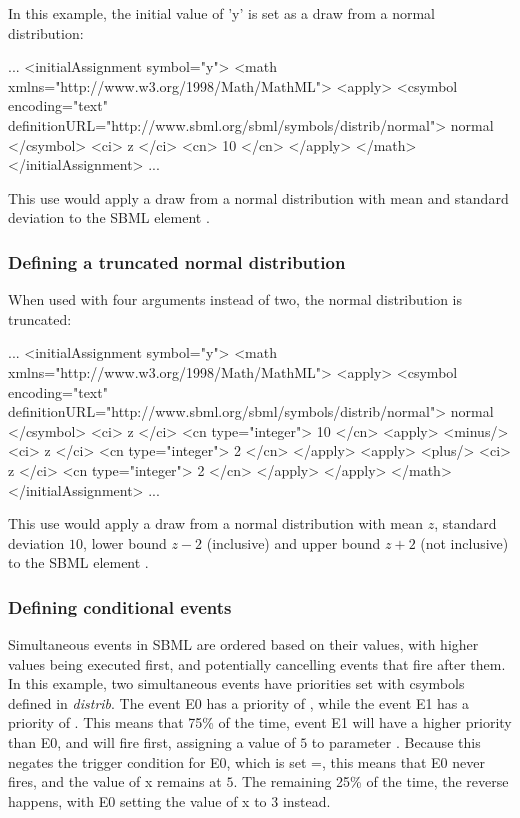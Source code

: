 \documentclass[draftspec]{sbmlpkgspec}
\newcommand{\distribshort}{\emph{distrib}\xspace}
\begin{document}
In this example, the initial value of 'y' is set as a draw from a normal distribution:

\begin{example}
...
  <initialAssignment symbol="y">
    <math xmlns="http://www.w3.org/1998/Math/MathML">
      <apply>
        <csymbol encoding="text" definitionURL="http://www.sbml.org/sbml/symbols/distrib/normal">
          normal
        </csymbol>
        <ci> z </ci>
        <cn> 10 </cn>
      </apply>
    </math>
  </initialAssignment>
...
\end{example}

This use would apply a draw from a normal distribution with mean  and standard deviation  to the SBML element .

\subsubsection{Defining a truncated normal distribution}

When used with four arguments instead of two, the normal distribution is truncated:

\begin{example}
...
  <initialAssignment symbol="y">
    <math xmlns="http://www.w3.org/1998/Math/MathML">
      <apply>
        <csymbol encoding="text" definitionURL="http://www.sbml.org/sbml/symbols/distrib/normal">
          normal
        </csymbol>
        <ci> z </ci>
        <cn type="integer"> 10 </cn>
        <apply>
          <minus/>
          <ci> z </ci>
          <cn type="integer"> 2 </cn>
        </apply>
        <apply>
          <plus/>
          <ci> z </ci>
          <cn type="integer"> 2 </cn>
        </apply>
      </apply>
    </math>
  </initialAssignment>
...
\end{example}

This use would apply a draw from a normal distribution with mean $z$, standard deviation $10$, lower bound $z-2$ (inclusive) and upper bound $z+2$ (not inclusive) to the SBML element .

\subsubsection{Defining conditional events}

Simultaneous events in SBML are ordered based on their \Priority values, with higher values being executed first, and potentially cancelling events that fire after them.  In this example, two simultaneous events have priorities set with csymbols defined in \distribshort.  The event E0 has a priority of , while the event E1 has a priority of .  This means that 75\% of the time, event E1 will have a higher priority than E0, and will fire first, assigning a value of $5$ to parameter .  Because this negates the trigger condition for E0, which is set =, this means that E0 never fires, and the value of x remains at $5$.  The remaining 25\% of the time, the reverse happens, with E0 setting the value of x to $3$ instead.
\end{document}
